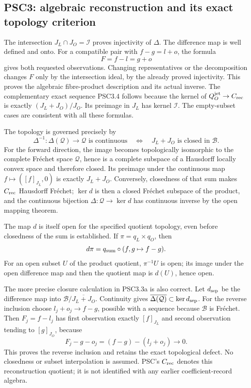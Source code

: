 \subsection{PSC3: algebraic reconstruction and its exact topology
criterion}\label{psc3-algebraic-reconstruction-and-its-exact-topology-criterion}

The intersection \(J_L\cap J_O=\mathcal I\) proves injectivity of
\(\Delta\). The difference map is well defined and onto. For a
compatible pair with \(f-g=l+o\), the formula \[
F=f-l=g+o
\] gives both requested observations. Changing representatives or the
decomposition changes \(F\) only by the intersection ideal, by the
already proved injectivity. This proves the algebraic fibre-product
description and its actual inverse. The complementary exact sequence
PSC3.4 follows because the kernel of \(Q_O^{\rm jet}\to C_{\rm rec}\) is
exactly \((J_L+J_O)/J_O\). Its preimage in \(J_L\) has kernel
\(\mathcal I\). The empty-subset cases are consistent with all these
formulas.

The topology is governed precisely by \[
\Delta^{-1}:\Delta(\mathcal Q)\longrightarrow\mathcal Q
\text{ is continuous}
\quad\Longleftrightarrow\quad
J_L+J_O\text{ is closed in }\mathcal B.
\tag{PSCA1}
\] For the forward direction, the image becomes topologically isomorphic
to the complete Fréchet space \(\mathcal Q\), hence is a complete
subspace of a Hausdorff locally convex space and therefore closed. Its
preimage under the continuous map \(f\mapsto([f]_{J_L},0)\) is exactly
\(J_L+J_O\). Conversely, closedness of that sum makes \(C_{\rm rec}\)
Hausdorff Fréchet; \(\ker d\) is then a closed Fréchet subspace of the
product, and the continuous bijection \(\Delta:\mathcal Q\to\ker d\) has
continuous inverse by the open mapping theorem.

The map \(d\) is itself open for the specified quotient topology, even
before closedness of the sum is established. If \(\pi=q_L\times q_O\),
then \[
d\pi=q_{\rm sum}\circ(f,g\mapsto f-g).
\] For an open subset \(U\) of the product quotient, \(\pi^{-1}U\) is
open; its image under the open difference map and then the quotient map
is \(d(U)\), hence open.

The more precise closure calculation in PSC3.3a is also correct. Let
\(d_{\rm sep}\) be the difference map into
\(\mathcal B/\overline{J_L+J_O}\). Continuity gives
\(\overline{\Delta(\mathcal Q)}\subset\ker d_{\rm sep}\). For the
reverse inclusion choose \(l_j+o_j\to f-g\), possible with a sequence
because \(\mathcal B\) is Fréchet. Then \(F_j=f-l_j\) has first
observation exactly \([f]_{J_L}\) and second observation tending to
\([g]_{J_O}\), because \[
F_j-g-o_j=(f-g)-(l_j+o_j)\longrightarrow0.
\] This proves the reverse inclusion and retains the exact topological
defect. No closedness or subset interpolation is assumed. PSC's
\(C_{\rm rec}\) denotes this reconstruction quotient; it is not
identified with any earlier coefficient-record algebra.

